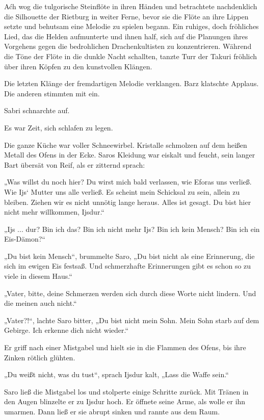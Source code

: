 Aćh wog die tulgorische Steinflöte in ihren Händen und betrachtete nachdenklich die Silhouette der Rietburg in weiter Ferne, bevor sie die Flöte an ihre Lippen setzte und behutsam eine Melodie zu spielen begann. Ein ruhiges, doch fröhliches Lied, das die Helden aufmunterte und ihnen half, sich auf die Planungen ihres Vorgehens gegen die bedrohlichen Drachenkultisten zu konzentrieren. Während die Töne der Flöte in die dunkle Nacht schallten, tanzte Turr der Takuri fröhlich über ihren Köpfen zu den kunstvollen Klängen.

Die letzten Klänge der fremdartigen Melodie verklangen. Barz klatschte Applaus. Die anderen stimmten mit ein.

Sabri schnarchte auf.

Es war Zeit, sich schlafen zu legen.



\trennzeichen



Die ganze Küche war voller Schneewirbel. Kristalle schmolzen auf dem heißen Metall des Ofens in der Ecke. Saros Kleidung war eiskalt und feucht, sein langer Bart übersät von Reif, als er zitternd sprach:

„Was willst du noch hier? Du wirst mich bald verlassen, wie Eforas uns verließ. Wie Ijs‘ Mutter uns alle verließ. Es scheint mein Schicksal zu sein, allein zu bleiben. Ziehen wir es nicht unnötig lange heraus. Alles ist gesagt. Du bist hier nicht mehr willkommen, Ijsdur.“

„Ijs ... dur? Bin ich das? Bin ich nicht mehr Ijs? Bin ich kein Mensch? Bin ich ein Eis-Dämon?“

„Du bist kein Mensch“, brummelte Saro, „Du bist nicht als eine Erinnerung, die sich im ewigen Eis festsaß. Und schmerzhafte Erinnerungen gibt es schon so zu viele in diesem Haus.“

„Vater, bitte, deine Schmerzen werden sich durch diese Worte nicht lindern. Und die meinen auch nicht.“

„Vater?!“, lachte Saro bitter, „Du bist nicht mein Sohn. Mein Sohn starb auf dem Gebirge. Ich erkenne dich nicht wieder.“

Er griff nach einer Mistgabel und hielt sie in die Flammen des Ofens, bis ihre Zinken rötlich glühten.

„Du weißt nicht, was du tust“, sprach Ijsdur kalt, „Lass die Waffe sein.“

Saro ließ die Mistgabel los und stolperte einige Schritte zurück. Mit Tränen in den Augen blinzelte er zu Ijsdur hoch. Er öffnete seine Arme, als wolle er ihn umarmen. Dann ließ er sie abrupt sinken und rannte aus dem Raum.



